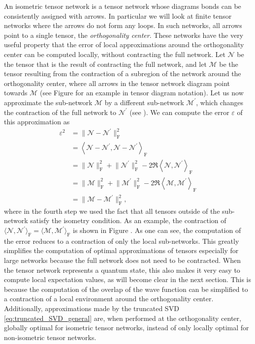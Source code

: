 An isometric tensor network is a tensor network whose diagrams bonds can be consistently assigned with arrows. In particular we will look at finite tensor networks where the arrows do not form any loops. In such networks, all arrows point to a single tensor, the \textit{orthogonality center}. These networks have the very useful property that the error of local approximations around the orthogonality center can be computed locally, without contracting the full network. Let $\mathcal{N}$ be the tensor that is the result of contracting the full network, and let $\mathcal{M}$ be the tensor resulting from the contraction of a subregion of the network around the orthogonality center, where all arrows in the tensor network diagram point towards $\mathcal{M}$ (see Figure  for an example in tensor diagram notation). Let us now approximate the sub-network $\mathcal{M}$ by a different sub-network $\mathcal{M}^\prime$, which changes the contraction of the full network to $\mathcal{N}^\prime$ (see ). We can compute the error $\varepsilon$ of this approximation as
\begin{equation}
\begin{split}
	\varepsilon^2 &= \lVert\mathcal{N}-\mathcal{N}^\prime\rVert^2_\text{F} \\
	&=
	\left\langle\mathcal{N}-\mathcal{N}^\prime, \mathcal{N}-\mathcal{N}^\prime\right\rangle_\text{F} \\
	&= \lVert\mathcal{N}\rVert_\text{F}^2 + \lVert\mathcal{N}^\prime\rVert_\text{F}^2 - 2\Re\left\langle\mathcal{N},\mathcal{N}^\prime\right\rangle_\text{F} \\
	&= \lVert\mathcal{M}\rVert_\text{F}^2 + \lVert\mathcal{M}^\prime\rVert_\text{F}^2 - 2\Re\left\langle\mathcal{M},\mathcal{M}^\prime\right\rangle_\text{F} \\
	&= \lVert\mathcal{M}-\mathcal{M}^\prime\rVert^2_\text{F},
\end{split}
\end{equation}
where in the fourth step we used the fact that all tensors outside of the sub-network satisfy the isometry condition. As an example, the contraction of $\langle\mathcal{N},\mathcal{N}^\prime\rangle_\text{F} = \langle\mathcal{M},\mathcal{M}^\prime\rangle_\text{F}$ is shown in Figure . As one can see, the computation of the error reduces to a contraction of only the local sub-networks. This greatly simplifies the computation of optimal approximations of tensors especially for large networks because the full network does not need to be contracted. When the tensor network represents a quantum state, this also makes it very easy to compute local expectation values, as will become clear in the next section. This is because the computation of the overlap of the wave function can be simplified to a contraction of a local environment around the orthogonality center. Additionally, approximations made by the truncated SVD \eqref{eq:truncated_SVD_general} are, when performed at the orthogonality center, globally optimal for isometric tensor networks, instead of only locally optimal for non-isometric tensor networks.
